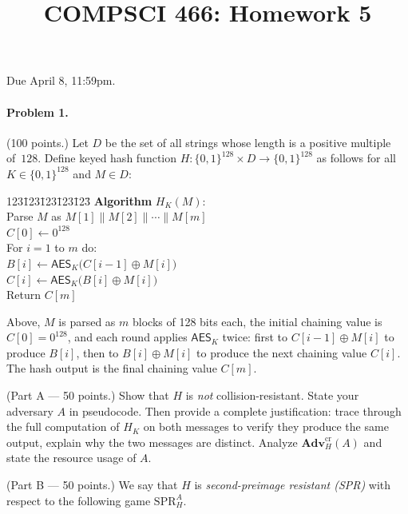 \documentclass[11pt]{article}
\title{COMPSCI 466: Homework 5}
\date{}
\newcommand{\bits}{\{0,1\}}
\begin{document}
\maketitle
\thispagestyle{fancy}

\noindent Due April 8, 11:59pm.


\paragraph*{Problem 1.} (100 points.)
Let $D$ be the set of all strings whose length is a positive multiple of~$128$.
Define keyed hash function $H \colon \bits^{128} \times D \to \bits^{128}$
as follows for all $K \in \bits^{128}$ and $M \in D$:

\begin{center}
\begin{minipage}{1.5in}
\begin{tabbing}
123\=123\=123\=123\=123\=\kill
\textbf{Algorithm} $H_K(M)$: \\
\> Parse $M$ as $M[1] \| M[2] \| \cdots \| M[m]$ \\
\> $C[0] \gets 0^{128}$ \\
\> For $i = 1$ to $m$ do: \\
\>\> $B[i] \gets \mathsf{AES}_K\!\bigl(C[i-1] \oplus M[i]\bigr)$ \\
\>\> $C[i] \gets \mathsf{AES}_K\!\bigl(B[i]   \oplus M[i]\bigr)$ \\
\> Return $C[m]$
\end{tabbing}
\end{minipage}
\end{center}

\noindent
Above, $M$ is parsed as $m$ blocks of 128 bits each, the initial
chaining value is $C[0] = 0^{128}$, and each round applies
$\mathsf{AES}_K$ twice: first to $C[i-1] \oplus M[i]$ to produce $B[i]$,
then to $B[i] \oplus M[i]$ to produce the next chaining value $C[i]$.
The hash output is the final chaining value $C[m]$.

\medskip

\noindent (Part A --- 50 points.)
Show that $H$ is \emph{not} collision-resistant.
State your adversary $A$ in pseudocode.
Then provide a complete justification: trace through the full computation
of $H_K$ on both messages to verify they produce the same output,
explain why the two messages are distinct.
Analyze $\mathbf{Adv}^{\mathrm{cr}}_H(A)$  and
state the resource usage of $A$.

\medskip

\noindent (Part B --- 50 points.)
We say that $H$ is \emph{second-preimage resistant (SPR)} with respect to
the following game $\mathrm{SPR}^A_H$.
\end{document}

